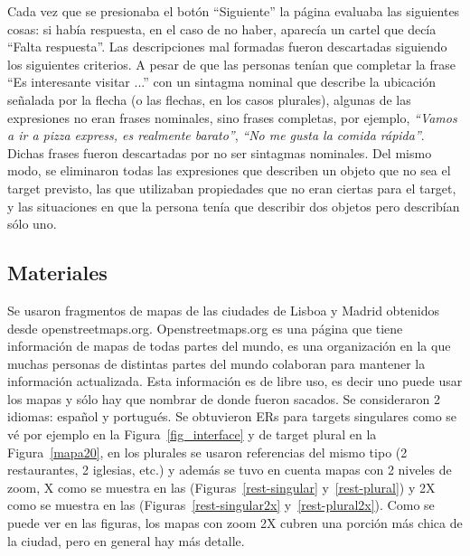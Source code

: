Cada vez que se presionaba el bot\'on ``Siguiente'' la p\'agina evaluaba las siguientes cosas: si hab\'ia respuesta, en el caso de no haber, aparec\'ia un cartel que dec\'ia ``Falta respuesta''.
Las descripciones mal formadas fueron descartadas siguiendo los siguientes criterios. A pesar de que las personas ten\'{i}an que completar la frase ``Es interesante visitar ...'' con un sintagma nominal que describe la ubicaci\'on se\~nalada por la flecha (o las flechas, en los casos plurales), algunas de las expresiones no eran frases nominales, sino frases completas, por ejemplo, \emph{``Vamos a ir a pizza express, es realmente barato''}, \emph{``No me gusta la comida r\'apida''}. Dichas frases fueron descartadas por no ser sintagmas nominales. Del mismo modo, se eliminaron todas las expresiones que describen un objeto que no sea el target previsto, las que utilizaban propiedades que no eran ciertas para el target, y las situaciones en que la persona ten\'{i}a que describir dos objetos pero describ\'ian s\'olo uno.



\subsection{Materiales}
\label{corpus-materiales}

Se usaron fragmentos de mapas de las ciudades de Lisboa y Madrid obtenidos desde openstreetmaps.org. Openstreetmaps.org es una p\'agina que tiene informaci\'on de mapas de todas partes del mundo, es una organizaci\'on en la que muchas personas de distintas partes del mundo colaboran para mantener la informaci\'on actualizada. Esta informaci\'on es de libre uso, es decir uno puede usar los mapas y s\'olo hay que nombrar de donde fueron sacados.
Se consideraron 2 idiomas: espa\~nol y portugu\'es. Se obtuvieron ERs para targets singulares como se v\'e por ejemplo en la Figura~\ref{fig_interface} y de target plural en la Figura~\ref{mapa20}, en los plurales se usaron referencias del mismo tipo (2 restaurantes, 2 iglesias, etc.) y adem\'as se tuvo en cuenta mapas con 2 niveles de zoom, X como se muestra en las (Figuras~\ref{rest-singular} y~\ref{rest-plural}) y 2X como se muestra en las (Figuras~\ref{rest-singular2x} y~\ref{rest-plural2x}). Como se puede ver en las figuras, los mapas con zoom 2X cubren una porci\'on m\'as chica de la ciudad, pero en general hay m\'as detalle.

